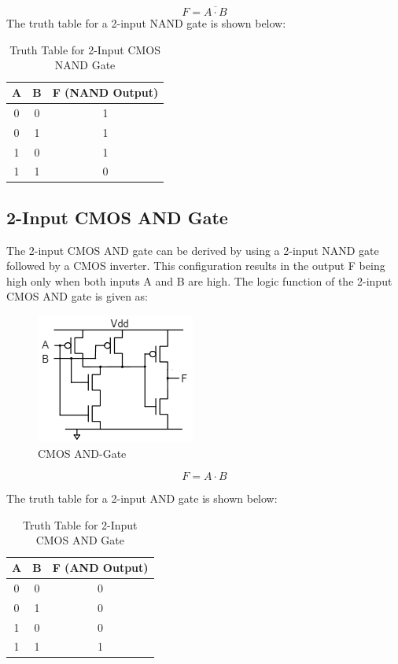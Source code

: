 \documentclass[a4paper,12pt]{article}
\begin{document}
	\[
	F = \overline{A \cdot B}
	\]
	\newpage
	The truth table for a 2-input NAND gate is shown below:
	
	\begin{table}[H]
		\centering
			\caption{Truth Table for 2-Input CMOS NAND Gate}
		\begin{tabular}{|c|c|c|}
			\hline
			\textbf{A} & \textbf{B} & \textbf{F (NAND Output)} \\ \hline
			0          & 0          & 1                       \\ \hline
			0          & 1          & 1                       \\ \hline
			1          & 0          & 1                       \\ \hline
			1          & 1          & 0                       \\ \hline
		\end{tabular}
	
		\label{tab:nand_gate}
	\end{table}
	
	\subsection{2-Input CMOS AND Gate}
	The 2-input CMOS AND gate can be derived by using a 2-input NAND gate followed by a CMOS inverter. This configuration results in the output F being high only when both inputs A and B are high. The logic function of the 2-input CMOS AND gate is given as:
	
\begin{figure}[H]
	\centering
	\includegraphics[width=0.45\linewidth]{Images/8}
	\caption{CMOS AND-Gate}
	\label{fig:8}
\end{figure}
	
	
	\[
	F = A \cdot B
	\]
	
	The truth table for a 2-input AND gate is shown below:
	
	\begin{table}[H]
		\centering
			\caption{Truth Table for 2-Input CMOS AND Gate}
		\begin{tabular}{|c|c|c|}
			\hline
			\textbf{A} & \textbf{B} & \textbf{F (AND Output)} \\ \hline
			0          & 0          & 0                       \\ \hline
			0          & 1          & 0                       \\ \hline
			1          & 0          & 0                       \\ \hline
			1          & 1          & 1                       \\ \hline
		\end{tabular}
	
		\label{tab:and_gate}
	\end{table}
	\newpage
\end{document}
